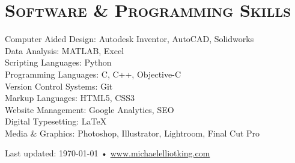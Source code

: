\documentclass[12pt, letterpaper]{article}
\newcommand{\years}[1]{\marginnote{\scriptsize #1}} %
\begin{document}
\section*{\scshape Software \& Programming Skills}
Computer Aided Design: Autodesk Inventor, AutoCAD, Solidworks\\
Data Analysis: MATLAB, Excel\\
Scripting Languages: Python\\
Programming Languages: C, C++, Objective-C\\
Version Control Systems: Git\\
Markup Languages: HTML5, CSS3\\
Website Management: Google Analytics, SEO\\
Digital Typesetting: \LaTeX \\
Media \& Graphics: Photoshop, Illustrator, Lightroom, Final Cut Pro



\vfill{}


\begin{center}
{\scriptsize Last updated: \today\- •\- \href{http://www.michaelelliotking.com}{www.michaelelliotking.com}}
\end{center}
\end{document}
